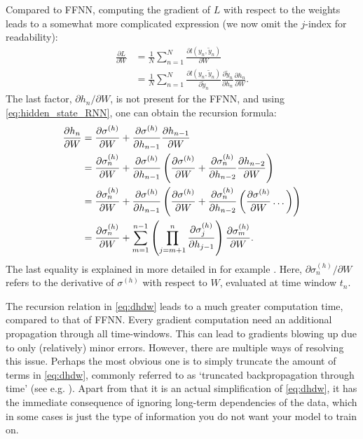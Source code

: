 \documentclass[%
reprint,
amsmath,amssymb,
aps,
]{revtex4-2}
\begin{document}
Compared to FFNN, computing the gradient of \(L\) with respect to the weights leads to a somewhat more complicated expression (we now omit the \(j\)-index for readability):
\begin{align}
	\frac{\partial L}{\partial W} &= \frac{1}{N}\sum\limits_{n=1}^{N} \frac{\partial l(y_{n}, \tilde{y}_n)}{\partial W}  \\
	&= \frac{1}{N}\sum\limits_{n=1}^{N} \frac{\partial l(y_{n}, \tilde{y}_n)}{\partial \tilde{y}_{n}} \frac{\partial \tilde{y}_{n}}{\partial h_n}\frac{\partial h_n}{\partial W}.
\end{align}
The last factor, \( \partial h_n/\partial W \), is not present for the FFNN, and using \eqref{eq:hidden_state_RNN}, one can obtain the recursion formula:
\begin{align}	\label{eq:dhdw}
	\frac{\partial h_n}{\partial W}  &= \frac{\partial \sigma^{(h)}}{\partial W} + \frac{\partial \sigma^{(h)}}{\partial h_{n-1}} \frac{\partial h_{n-1}}{\partial W}\notag\\ 
	&= \frac{\partial \sigma_{n}^{(h)}}{\partial W} + \frac{\partial \sigma^{(h)}}{\partial h_{n-1}}  \left( \frac{\partial \sigma^{(h)}}{\partial W} + \frac{\partial \sigma^{(h)}_{n}}{\partial h_{n-2}} \frac{\partial h_{n-2}}{\partial W} \right) \notag \\
	&= \frac{\partial \sigma_{n}^{(h)}}{\partial W} + \frac{\partial \sigma^{(h)}}{\partial h_{n-1}}  \left( \frac{\partial \sigma^{(h)}}{\partial W} + \frac{\partial \sigma_{n}^{(h)}}{\partial h_{n-2}} \left( \frac{\partial \sigma^{(h)}}{\partial W}\dots \right) \right) \notag\\ 
	&= \frac{\partial \sigma_{n}^{(h)}}{\partial W} + \sum\limits_{m=1}^{n-1}\left( \prod_{j=m+1}^{n} \frac{\partial \sigma^{(h)}_{j}}{\partial h_{j-1}} \right) \frac{\partial \sigma^{(h)}_{m}}{\partial W}.
\end{align}
The last equality is explained in more detailed in for example \cite{jaeger2002tutorial}. Here, \(\partial \sigma_{n}^{(h)} /\partial W\) refers to the derivative of \(\sigma^{(h)}\) with respect to \(W\), evaluated at time window \(t_{n}\).

The recursion relation in \eqref{eq:dhdw} leads to a much greater computation time, compared to that of FFNN. Every gradient computation need an additional propagation through all time-windows. This can lead to gradients blowing up due to only (relatively) minor errors. However, there are multiple ways of resolving this issue. Perhaps the most obvious one is to simply truncate the amount of terms in \eqref{eq:dhdw}, commonly referred to as `truncated backpropagation through time' (see e.g. \cite{tallec2017unbiasingtruncatedbackpropagationtime}). Apart from that it is an actual simplification of \eqref{eq:dhdw}, it has the immediate consequence of ignoring long-term dependencies of the data, which in some cases is just the type of information you do not want your model to train on. 
\end{document}
